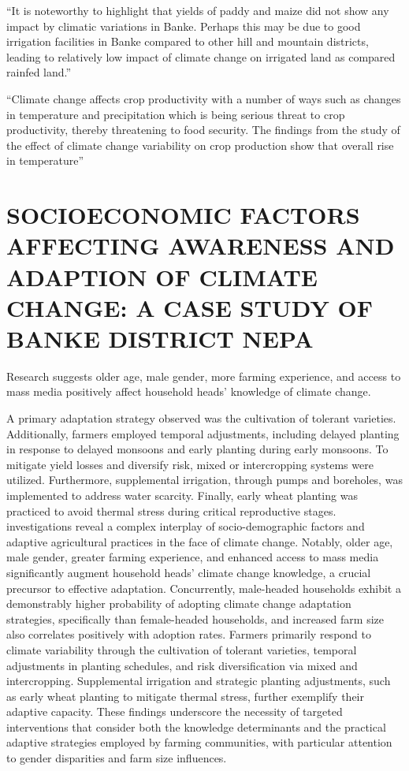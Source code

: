\documentclass[a4paper,12pt]{article}
\begin{document}
“It is noteworthy to highlight that yields of paddy and maize did not show any impact by climatic variations in Banke. Perhaps this may be due to good irrigation facilities in Banke compared to other hill and mountain districts, leading to relatively low impact of climate change on irrigated land as compared rainfed land.” 

“Climate change affects crop productivity with a number of ways such as changes in temperature and precipitation which is being serious threat to crop productivity, thereby threatening to food security. The findings from the study of the effect of climate change variability on crop production show that overall rise in temperature” 

\section{SOCIOECONOMIC FACTORS AFFECTING AWARENESS AND ADAPTION OF CLIMATE CHANGE: A CASE STUDY OF BANKE DISTRICT NEPA}
\parencite{shresthaSOCIOECONOMICFACTORSAFFECTING2018b}
Research suggests older age, male gender, more farming experience, and access to mass media positively affect household heads' knowledge of climate change.

A primary adaptation strategy observed was the cultivation of tolerant varieties. Additionally, farmers employed temporal adjustments, including delayed planting in response to delayed monsoons and early planting during early monsoons. To mitigate yield losses and diversify risk, mixed or intercropping systems were utilized. Furthermore, supplemental irrigation, through pumps and boreholes, was implemented to address water scarcity. Finally, early wheat planting was practiced to avoid thermal stress during critical reproductive stages.
investigations reveal a complex interplay of socio-demographic factors and adaptive agricultural practices in the face of climate change. Notably, older age, male gender, greater farming experience, and enhanced access to mass media significantly augment household heads' climate change knowledge, a crucial precursor to effective adaptation. Concurrently, male-headed households exhibit a demonstrably higher probability of adopting climate change adaptation strategies, specifically than female-headed households, and increased farm size also correlates positively with adoption rates. Farmers primarily respond to climate variability through the cultivation of tolerant varieties, temporal adjustments in planting schedules, and risk diversification via mixed and intercropping. Supplemental irrigation and strategic planting adjustments, such as early wheat planting to mitigate thermal stress, further exemplify their adaptive capacity. These findings underscore the necessity of targeted interventions that consider both the knowledge determinants and the practical adaptive strategies employed by farming communities, with particular attention to gender disparities and farm size influences.
\end{document}
